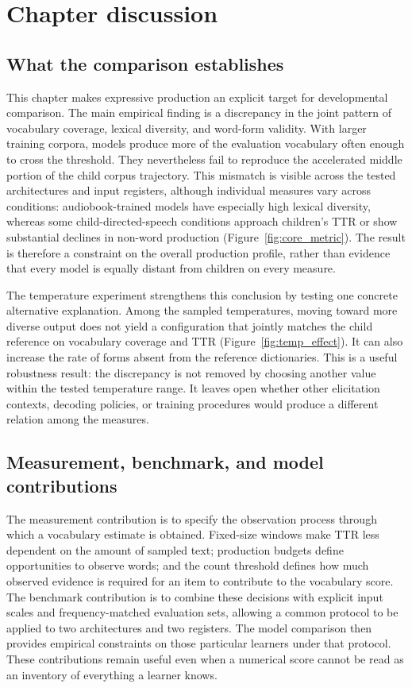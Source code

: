 \section{Chapter discussion}
\label{sec:ch3:chapter-discussion}

\subsection{What the comparison establishes}

This chapter makes expressive production an explicit target for developmental comparison. The main empirical finding is a discrepancy in the joint pattern of vocabulary coverage, lexical diversity, and word-form validity. With larger training corpora, models produce more of the evaluation vocabulary often enough to cross the \meCDI{} threshold. They nevertheless fail to reproduce the accelerated middle portion of the child corpus trajectory. This mismatch is visible across the tested architectures and input registers, although individual measures vary across conditions: audiobook-trained models have especially high lexical diversity, whereas some child-directed-speech conditions approach children's TTR or show substantial declines in non-word production (Figure~\ref{fig:core_metric}). The result is therefore a constraint on the overall production profile, rather than evidence that every model is equally distant from children on every measure.

The temperature experiment strengthens this conclusion by testing one concrete alternative explanation. Among the sampled temperatures, moving toward more diverse output does not yield a configuration that jointly matches the child reference on vocabulary coverage and TTR (Figure~\ref{fig:temp_effect}). It can also increase the rate of forms absent from the reference dictionaries. This is a useful robustness result: the discrepancy is not removed by choosing another value within the tested temperature range. It leaves open whether other elicitation contexts, decoding policies, or training procedures would produce a different relation among the measures.

\subsection{Measurement, benchmark, and model contributions}

The measurement contribution is to specify the observation process through which a vocabulary estimate is obtained. Fixed-size windows make TTR less dependent on the amount of sampled text; production budgets define opportunities to observe words; and the count threshold defines how much observed evidence is required for an item to contribute to the vocabulary score. The benchmark contribution is to combine these decisions with explicit input scales and frequency-matched evaluation sets, allowing a common protocol to be applied to two architectures and two registers. The model comparison then provides empirical constraints on those particular learners under that protocol. These contributions remain useful even when a numerical score cannot be read as an inventory of everything a learner knows.

